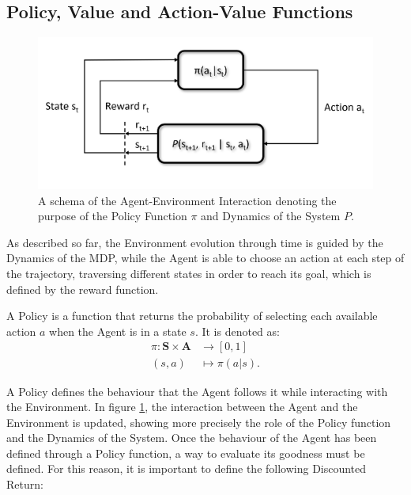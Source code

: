         \subsection{Policy, Value and Action-Value Functions}
            \label{subs:PVQ}
            
            \begin{figure}[t]
                \centering
                \includegraphics[width=14cm, keepaspectratio]{images/mdp/int_schema_def.png}
                \caption{A schema of the Agent-Environment Interaction denoting the purpose of the Policy Function $\pi$ and Dynamics of the System $P$.}
                \label{fig:int_schema_def}
            \end{figure}
            
            As described so far, the Environment evolution through time is guided by the Dynamics of the MDP, while the Agent is able to choose an action at each step of the trajectory, traversing different states in order to reach its goal, which is defined by the reward function. 
            
            \begin{definition}[Policy]
                \label{def:policy}
                A Policy is a function that returns the probability of selecting each available action $a$ when the Agent is in a state $s$. It is denoted as:
                \begin{align*}
                  \pi : \mathbf{S} \times \mathbf{A} &\rightarrow [0, 1]\\
                  (s,a) &\mapsto \pi(a|s).
                \end{align*}
            \end{definition}

            A Policy defines the behaviour that the Agent follows it while interacting with the Environment. In figure \ref{fig:int_schema_def}, the interaction between the Agent and the Environment is updated, showing more precisely the role of the Policy function and the Dynamics of the System. Once the behaviour of the Agent has been defined through a Policy function, a way to evaluate its goodness must be defined. For this reason, it is important to define the following Discounted Return:
            
